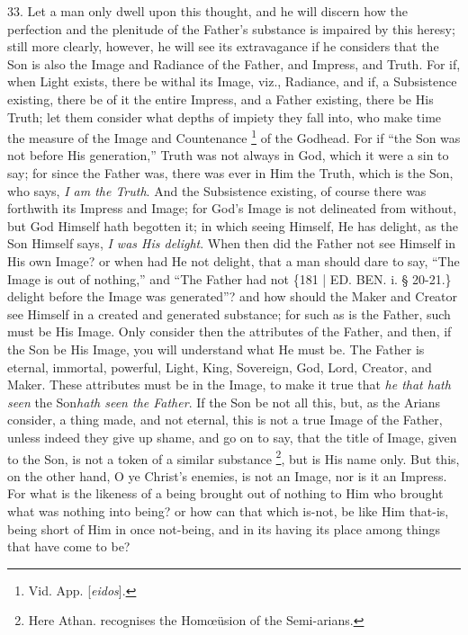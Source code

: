 33. Let a man only dwell upon
this thought, and he will discern how the perfection and the plenitude
of the Father's substance is impaired by this heresy; still more
clearly, however, he will see its extravagance if he considers that
the Son is also the Image and Radiance of the Father, and Impress, and
Truth. For if, when Light exists, there be withal its Image, viz.,
Radiance, and if, a Subsistence existing, there be of it the entire
Impress, and a Father existing, there be His Truth; let them consider
what depths of impiety they fall into, who make time the measure of
the Image and Countenance \footnote{Vid. App. [\emph{eidos}].}
of the Godhead. For if ``the Son was not before His generation,'' Truth
was not always in God, which it were a sin to say; for since the
Father was, there was ever in Him the Truth, which is the Son, who
says, \emph{I am the Truth}. And the Subsistence existing, of course
there was forthwith its Impress and Image; for God's Image is not
delineated from without, but God Himself hath begotten it; in which
seeing Himself, He has delight, as the Son Himself says, \emph{I was His
delight}. When then did the Father not see Himself in His own
Image? or when had He not delight, that a man should dare to say, ``The
Image is out of nothing,'' and ``The Father had not \{181 | ED.
BEN. i. § 20-21.\} delight before the Image was
generated''? and how should the Maker and Creator see Himself in a
created and generated substance; for such as is the Father, such must
be His Image. Only consider then the attributes of the Father, and
then, if the Son be His Image, you will understand what He must be.
The Father is eternal, immortal, powerful, Light, King, Sovereign,
God, Lord, Creator, and Maker. These attributes must be in the Image,
to make it true that \emph{he that hath seen} the Son\emph{hath seen the
Father}. If the Son be not all this, but, as the Arians consider, a
thing made, and not eternal, this is not a true Image of the Father,
unless indeed they give up shame, and go on to say, that the title of
Image, given to the Son, is not a token of a similar substance \footnote{Here Athan. recognises the Homœüsion of the Semi-arians.}, but is His name only. But this, on the other hand, O ye
Christ's enemies, is not an Image, nor is it an Impress. For what is
the likeness of a being brought out of nothing to Him who brought what
was nothing into being? or how can that which is-not, be like Him
that-is, being short of Him in once not-being, and in its having its
place among things that have come to be?

